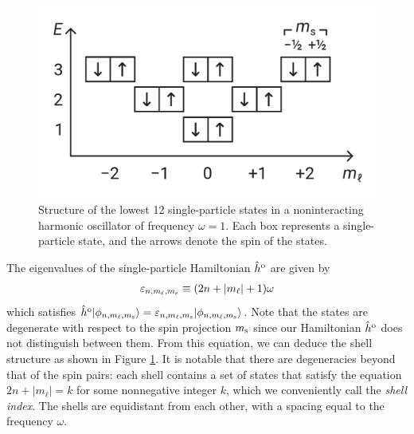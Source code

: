 \documentclass[amsmath, amssymb, aps, floatfix, nofootinbib, preprintnumbers,showpacs, superscriptaddress, twocolumn]{revtex4-1}
\newcommand{\ket}[1]{| #1 \rangle}
\begin{document}
\begin{figure}
\includegraphics[width=.48\textwidth]{fig-shell-structure}
\caption{Structure of the lowest 12 single-particle states in a noninteracting
  harmonic oscillator of frequency $\omega = 1$.  Each box represents a
  single-particle state, and the arrows denote the spin of the states.}
\label{fig:shell-structure}
\end{figure}
The eigenvalues of the single-particle Hamiltonian $\hat h^{\text o}$ are
given by
\begin{align*}
  \varepsilon_{n, m_\ell, m_{\text s}} \equiv (2 n + |m_\ell| + 1) \omega
\end{align*}
which satisfies
$\hat{h}^{\text o} \ket{\phi_{n, m_\ell, m_{\text s}}} = \varepsilon_{n,
  m_\ell, m_{\text s}} \ket{\phi_{n, m_\ell, m_{\text s}}}$.  Note that the
states are degenerate with respect to the spin projection $m_{\text s}$ since
our Hamiltonian $\hat h^{\text o}$ does not distinguish between them.  From
this equation, we can deduce the shell structure as shown in Figure
\ref{fig:shell-structure}.  It is notable that there are degeneracies beyond
that of the spin pairs: each shell contains a set of states that satisfy the
equation $2 n + |m_\ell| = k$ for some nonnegative integer $k$, which we
conveniently call the \textit{shell index}.  The shells are equidistant from
each other, with a spacing equal to the frequency $\omega$.
\end{document}
